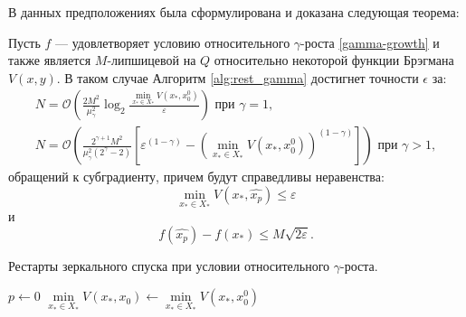     В данных предположениях была сформулирована и доказана следующая теорема:
    \begin{theorem} \label{simple_restart}
        Пусть $f$ --- удовлетворяет условию относительного $\gamma$-роста \eqref{gamma-growth} и также является $M$-липшицевой на $Q$ относительно некоторой функции Брэгмана $V(x, y)$. В таком случае Алгоритм \ref{alg:rest_gamma} достигнет точности $\epsilon$ за:
        \begin{equation}
        \begin{aligned}
           N =\mathcal{O}\left(\frac{2 M^2}{\mu_{\gamma}^2} \log_2{\frac{\min\limits_{x_* \in X_*}{V(x_*, x_0^0)}}{\varepsilon}}\right) \text{ при } \gamma = 1, \\
           N = \mathcal{O}\left(\frac{2^{\gamma + 1} M^2}{\mu_{\gamma}^2 (2^{\gamma} - 2)} \left[\varepsilon^{(1 - \gamma)} - \left(\min\limits_{x_* \in X_*}{V(x_*, x_0^0)}\right)^{(1 - \gamma)}\right]\right) \text{ при } \gamma > 1,
        \end{aligned}
        \end{equation}
        обращений к субградиенту, причем будут справедливы неравенства:
        \begin{equation}
            \min_{x_* \in X_*}{V(x_*, \widehat{x_p})} \leq \varepsilon
        \end{equation}
        и
        \begin{equation}
            f(\widehat{x_p}) - f(x_*) \leq M \sqrt{2 \varepsilon}.  
        \end{equation}
    \end{theorem}

    \begin{algorithm}[htp]
        \caption{Рестарты зеркального спуска при условии относительного $\gamma$-роста.}
        \label{alg:rest_gamma}
        $p \gets 0$\;
        $\min\limits_{x_* \in X_*}{V(x_*, x_0)} \gets \min\limits_{x_* \in X_*}{V(x_*,x_0^0)}$\;
    \end{algorithm}

